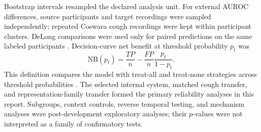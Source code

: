 Bootstrap intervals resampled the declared analysis unit. For external AUROC
differences, source participants and target recordings were sampled
independently; repeated Coswara cough recordings were kept within participant
clusters. DeLong comparisons were used only for paired
predictions on the same labeled participants \cite{delong1988auc}. Decision-curve net benefit at
threshold probability $p_t$ was
\begin{equation}
    \mathrm{NB}(p_t)=\frac{TP}{n}-\frac{FP}{n}\frac{p_t}{1-p_t}.
\end{equation}
This definition compares the model with treat-all and treat-none strategies
across threshold probabilities \cite{vickers2006dca}.
The selected internal system, matched cough transfer, and representation-family
transfer formed the primary reliability analyses in this report. Subgroups,
context controls, reverse temporal testing, and mechanism analyses were
post-development exploratory analyses; their $p$-values were not interpreted
as a family of confirmatory tests.
